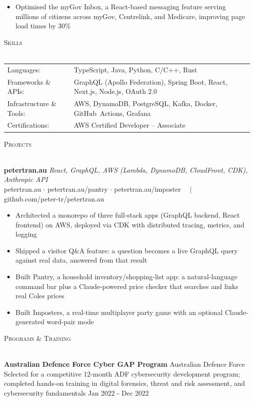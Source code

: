 \documentclass[a4paper]{article}
\newcommand{\lineunder}{
    \vspace*{-8pt} \\
    \hspace*{-18pt} \hrulefill \\
    \vspace*{-4pt}
}
\newcommand{\header}[1]{
    {\hspace*{-18pt}\vspace*{3pt} \textsc{#1}}
    \vspace*{-3pt} \lineunder
}
\begin{document}
\vspace{-2mm}
\begin{itemize} \itemsep -1pt
    \item Optimised the myGov Inbox, a React-based messaging feature serving millions of citizens across myGov, Centrelink, and Medicare, improving page load times by 30\%
\end{itemize}
\vspace{-2mm}
\header{Skills}
\vspace{1.5mm}
\begin{tabular}{ l p{6.7in} }
    Languages:                  & TypeScript, Java, Python, C/C++, Rust \\
    Frameworks \& APIs:        & GraphQL (Apollo Federation), Spring Boot, React, Next.js, Node.js, OAuth 2.0 \\
    Infrastructure \& Tools:   & AWS, DynamoDB, PostgreSQL, Kafka, Docker, \mbox{GitHub Actions}, Grafana \\
    Certifications:            & AWS Certified Developer -- Associate \\
\end{tabular}

\vspace{1.5mm}
\header{Projects}
{\textbf{petertran.au}} {\sl React, GraphQL, AWS (Lambda, DynamoDB, CloudFront, CDK), Anthropic API}\\
petertran.au $\cdot$ petertran.au/pantry $\cdot$ petertran.au/imposter $\quad|\quad$ github.com/peter-tr/petertran.au\\
\vspace{-2mm}
\begin{itemize} \itemsep -1pt
    \item Architected a monorepo of three full-stack apps (GraphQL backend, React frontend) on AWS, deployed via CDK with distributed tracing, metrics, and logging
    \item Shipped a visitor Q\&A feature: a question becomes a live GraphQL query against real data, answered from that result
    \item Built Pantry, a household inventory/shopping-list app: a natural-language command bar plus a Claude-powered price checker that searches and links real Coles prices
    \item Built Imposters, a real-time multiplayer party game with an optional Claude-generated word-pair mode
\end{itemize}
\vspace{-2mm}

\header{Programs \& Training}
\textbf{Australian Defence Force Cyber GAP Program} \hfill Australian Defence Force\\
Selected for a competitive 12-month ADF cybersecurity development program; completed hands-on training in digital forensics, threat and risk assessment, and cybersecurity fundamentals \hfill Jan 2022 - Dec 2022\\
\end{document}
